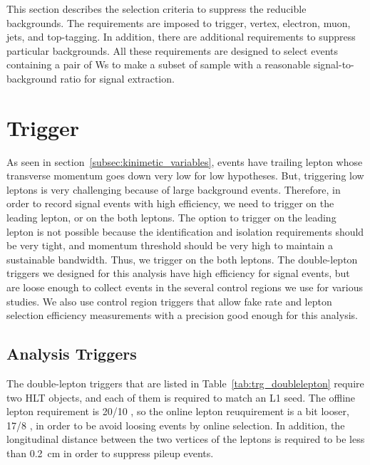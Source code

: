 This section describes the selection criteria to suppress the
reducible backgrounds. The requirements are imposed to 
trigger, vertex, electron, muon, jets, and top-tagging. 
In addition, there are additional requirements to suppress 
particular backgrounds. All these requirements are designed 
to select events containing a pair of Ws to make a subset of 
sample with a reasonable signal-to-background ratio for 
signal extraction. 


\section{Trigger}

As seen in section~\ref{subsec:kinimetic_variables}, \hww{} events have trailing lepton 
whose transverse momentum goes down very low for low \mHi{} hypotheses. 
But, triggering low 
\pt{} leptons is very challenging because of large background events. 
Therefore, in order to record signal events with high efficiency, 
we need to trigger on the leading lepton, 
or on the both leptons. The option to trigger on the leading lepton 
is not possible because the identification 
and isolation requirements should be very tight, and momentum threshold should be very 
high to maintain a sustainable bandwidth. Thus, we trigger on the both leptons. 
The double-lepton triggers we designed for this analysis have high efficiency for  
signal events, but are loose enough to collect events in the several control regions 
we use for various studies. We also use control region triggers that allow 
fake rate and lepton selection efficiency measurements with a precision
good enough for this analysis. 


\subsection{Analysis Triggers}

The double-lepton triggers that are listed in Table~\ref{tab:trg_doublelepton} require 
two HLT objects, and each of them is required to match an L1 seed. The offline lepton \pt{} 
requirement is 20/10 \GeV, so the online lepton \pt{} reuquirement is a bit looser, 17/8 \GeV, 
in order to be avoid loosing events by online selection. In addition,
the longitudinal distance between the two vertices of the leptons is required 
to be less than 0.2~cm in order to suppress pileup events. 

